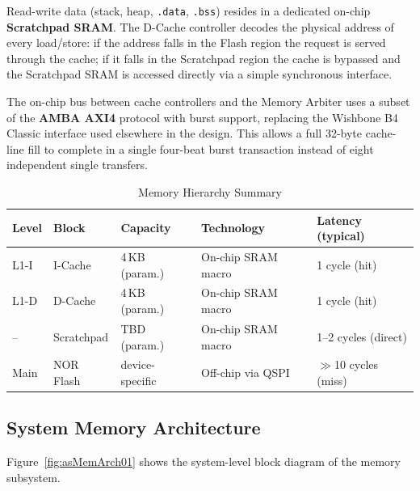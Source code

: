 Read-write data (stack, heap, \texttt{.data}, \texttt{.bss}) resides in a
dedicated on-chip \textbf{Scratchpad SRAM}.
The D-Cache controller decodes the physical address of every load/store: if
the address falls in the Flash region the request is served through the cache;
if it falls in the Scratchpad region the cache is bypassed and the Scratchpad
SRAM is accessed directly via a simple synchronous interface.

The on-chip bus between cache controllers and the Memory Arbiter uses a
subset of the \textbf{AMBA AXI4} protocol with burst support, replacing the
Wishbone B4 Classic interface used elsewhere in the design.
This allows a full 32-byte cache-line fill to complete in a single
four-beat burst transaction instead of eight independent single transfers.

\begin{table}[H]
\caption{Memory Hierarchy Summary}
\label{tab:asMemHierarchy}
\centering
\begin{tabularx}{\textwidth}{|l |l |l |l |X|}
  \hline
  Level & Block & Capacity & Technology & Latency (typical) \\
  \hline
  \hline
  L1-I & I-Cache    & 4\,KB (param.)  & On-chip SRAM macro  & 1 cycle (hit) \\
  \hline
  L1-D & D-Cache    & 4\,KB (param.)  & On-chip SRAM macro  & 1 cycle (hit) \\
  \hline
  --   & Scratchpad & TBD (param.)    & On-chip SRAM macro  & 1--2 cycles (direct) \\
  \hline
  Main & NOR Flash  & device-specific & Off-chip via QSPI   & \(\gg\)10 cycles (miss) \\
  \hline
\end{tabularx}
\end{table}

\subsection{System Memory Architecture}

Figure~\ref{fig:asMemArch01} shows the system-level block diagram of the
memory subsystem.

